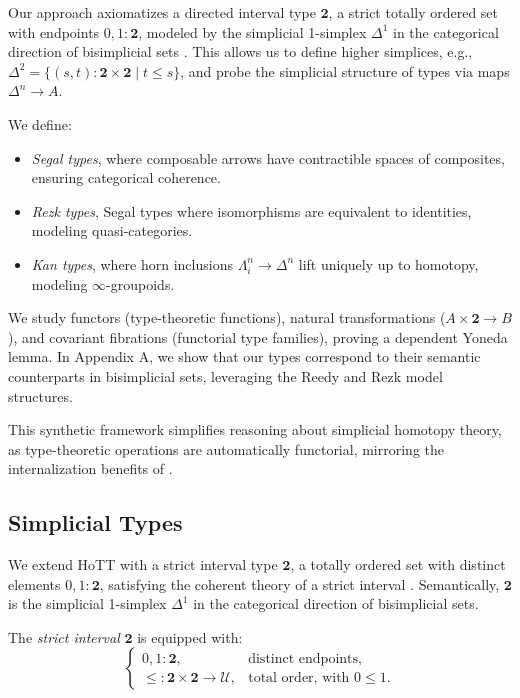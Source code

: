 \documentclass{article}
\begin{document}
Our approach axiomatizes a directed interval type $\mathbf{2}$, a strict totally ordered set with endpoints $0, 1 : \mathbf{2}$, modeled by the simplicial 1-simplex $\Delta^1$ in the categorical direction of bisimplicial sets \cite{JT06}. This allows us to define higher simplices, e.g., $\Delta^2 = \{(s,t) : \mathbf{2} \times \mathbf{2} \mid t \leq s\}$, and probe the simplicial structure of types via maps $\Delta^n \to A$.

We define:
\begin{itemize}
    \item \emph{Segal types}, where composable arrows have contractible spaces of composites, ensuring categorical coherence.
    \item \emph{Rezk types}, Segal types where isomorphisms are equivalent to identities, modeling quasi-categories.
    \item \emph{Kan types}, where horn inclusions $\Lambda^n_i \to \Delta^n$ lift uniquely up to homotopy, modeling $\infty$-groupoids.
\end{itemize}

We study functors (type-theoretic functions), natural transformations ($A \times \mathbf{2} \to B$), and covariant fibrations (functorial type families), proving a dependent Yoneda lemma. In Appendix A, we show that our types correspond to their semantic counterparts in bisimplicial sets, leveraging the Reedy and Rezk model structures.

This synthetic framework simplifies reasoning about simplicial homotopy theory, as type-theoretic operations are automatically functorial, mirroring the internalization benefits of \cite{Shu15}.

\newpage
\subsection{Simplicial Types}

We extend HoTT with a strict interval type $\mathbf{2}$, a totally ordered set with distinct elements $0, 1 : \mathbf{2}$, satisfying the coherent theory of a strict interval \cite{Joh79, MLM94}. Semantically, $\mathbf{2}$ is the simplicial 1-simplex $\Delta^1$ in the categorical direction of bisimplicial sets.

\begin{definition}
The \emph{strict interval} $\mathbf{2}$ is equipped with:
$$
\begin{cases}
    0, 1 : \mathbf{2}, & \text{distinct endpoints}, \\
    \leq : \mathbf{2} \times \mathbf{2} \to \mathcal{U}, & \text{total order, with } 0 \leq 1.
\end{cases}
$$
\end{definition}
\end{document}
